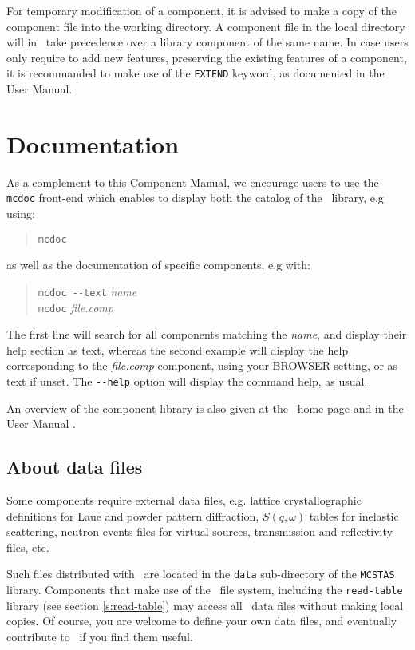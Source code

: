 For temporary modification of a component, it is advised to make a copy
of the component file into the working directory.
A component file in the local directory will in \MCS\ take precedence over
a library component of the same name. In case users only require to add new features, preserving the existing features of a component, it is recommanded to make use of the \verb+EXTEND+ keyword, as documented in the User Manual.

\section{Documentation}
As a complement to this Component Manual, we encourage users to use
the \verb+mcdoc+ front-end which enables to display both the
catalog of the \MCS\ library, e.g using: 
\begin{quote}
  \verb|mcdoc|
\end{quote}
as well as the documentation of specific components, e.g with:
\begin{quote}
  \verb|mcdoc --text| {\it name} \\
  \verb|mcdoc| {\it file.comp}
\end{quote}
The first line will search for all components matching the {\it name},
and display their help section as text,
whereas the second example will display the help corresponding to
the {\it file.comp} component, using your
BROWSER setting, or as text if unset.
The \verb+--help+ option will display the command help, as usual.

An overview of the component library is also given at the \MCS\ home page \cite{mcstas_webpage} and in the User Manual \cite{mcstasmanual}.

\subsection{About data files}
Some components require external data files,
e.g. lattice crystallographic definitions for Laue and powder pattern diffraction,
$S(q,\omega)$ tables for inelastic scattering,
neutron events files for virtual sources,
transmission and reflectivity files, etc.

Such files distributed with \MCS\ are located in the
\verb+data+ sub-directory of the \verb+MCSTAS+ library.
Components that make use of the \MCS\ file system,
including the \verb+read-table+ library (see section \ref{s:read-table})
may access all \MCS\ data files without making local copies.
Of course, you are welcome to define your own data files,
and eventually contribute to \MCS\ if you find them useful.

